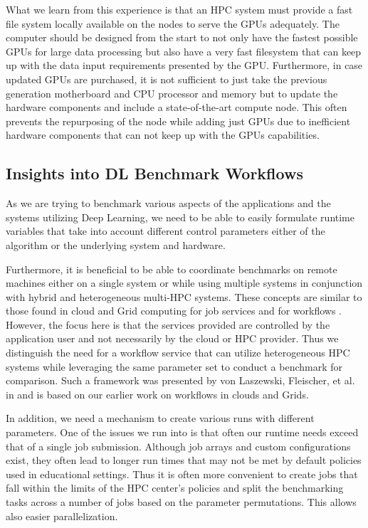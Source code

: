 \documentclass[utf8]{FrontiersinVancouver} %
\begin{document}
What we learn from this experience is that an HPC system must provide a fast file system locally available on the nodes to serve the GPUs adequately. The computer should be designed from the start to not only have the fastest possible GPUs for large data processing but also have a very fast filesystem that can keep up with the data input requirements presented by the GPU. Furthermore, in case updated GPUs are purchased, it is not sufficient to just take the previous generation motherboard and CPU processor and memory but to update the hardware components and include a state-of-the-art compute node. This often prevents the repurposing of the node while adding just GPUs due to inefficient hardware components that can not keep up with the GPUs capabilities.

  


\subsection{Insights into DL Benchmark Workflows}
\label{sec:workflow-main}

As we are trying to benchmark various aspects of the applications and the systems utilizing Deep Learning, we need to be able to easily formulate runtime variables that take into account different control parameters either of the algorithm or the underlying system and hardware.

Furthermore, it is beneficial to be able to coordinate benchmarks on remote machines either on a single system or while using multiple systems in conjunction with hybrid and heterogeneous multi-HPC systems. These concepts are similar to those found in cloud and Grid computing for job services \citep{las-infogram} and for workflows \citep{las-workflow,las07-workflow}. However, the focus here is that the services provided are controlled by the application user and not necessarily by the cloud or HPC provider. Thus we distinguish the need for a workflow service that can utilize heterogeneous HPC systems while leveraging the same parameter set to conduct a benchmark for comparison. Such a framework was presented by von Laszewski, Fleischer, et al. in \citep{las-22-arxiv-workflow-cc} and is based on our earlier work on workflows in clouds and Grids.

In addition, we need a mechanism to create various runs with different parameters. One of the issues we run into is that often our runtime needs exceed that of a single job submission. Although job arrays and custom configurations exist, they often lead to longer run times that may not be met by default policies used in educational settings. Thus it is often more convenient to create jobs that fall within the limits of the HPC center's policies and split the benchmarking tasks across a number of jobs based on the parameter permutations. This allows also easier parallelization.
\end{document}
